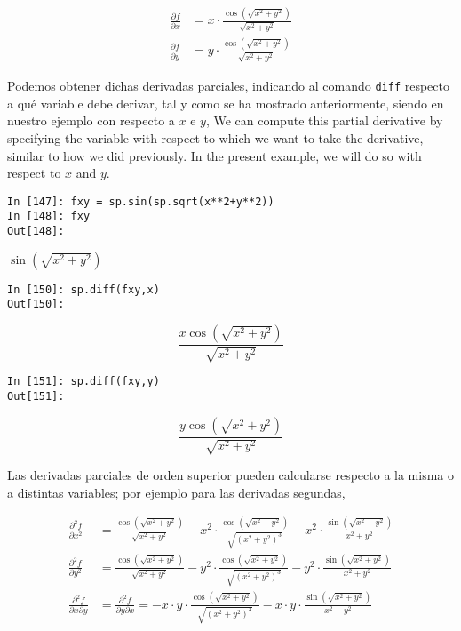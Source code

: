 \begin{align*}
\frac{\partial f}{\partial x} &= x\cdot\frac{\cos(\sqrt{x^2+y^2})}{\sqrt{x^2+y^2}} \\
\frac{\partial f}{\partial y} &= y\cdot\frac{\cos(\sqrt{x^2+y^2})}{\sqrt{x^2+y^2}}
\end{align*}
\begin{paracol}{2}
Podemos obtener dichas derivadas parciales, indicando al comando \texttt{diff} respecto a qué variable debe derivar, tal y como se ha mostrado anteriormente, siendo en nuestro ejemplo con respecto a $x$ e $y$,
\switchcolumn
We can compute this partial derivative by specifying the variable with respect to which we want to take the derivative, similar to how we did previously. In the present example, we will do so with respect to \(x\) and \(y\).  
\end{paracol}
\begin{center}
	\begin{minipage}{.5\textwidth}
		\begin{verbatim}
In [147]: fxy = sp.sin(sp.sqrt(x**2+y**2))
In [148]: fxy
Out[148]: 	
		\end{verbatim}
		$\sin(\sqrt{x^2+ y^2})$
		\begin{verbatim}
In [150]: sp.diff(fxy,x)
Out[150]: 
		\end{verbatim}
		\begin{equation*} \frac{x\cos(\sqrt{x^2+y^2})}{\sqrt{x^2+y^2}}\end{equation*}
		\begin{verbatim}
In [151]: sp.diff(fxy,y)
Out[151]:   
		\end{verbatim}
		\begin{equation*} \frac{y\cos(\sqrt{x^2+y^2})}{\sqrt{x^2+y^2}}\end{equation*}
	\end{minipage}
\end{center}

\begin{paracol}{2}
Las derivadas parciales de orden superior pueden calcularse respecto a la misma o a distintas variables; por ejemplo para las derivadas segundas,
\end{paracol}
\begin{align*}
\frac{\partial^2f}{\partial x^2} &= \frac{\cos(\sqrt{x^2+y^2})}{\sqrt{x^2+y^2}} - 
x^2 \cdot \frac{\cos(\sqrt{x^2+y^2})}{\sqrt{(x^2+y^2)^3}} -
x^2 \cdot \frac{\sin(\sqrt{x^2+y^2})}{x^2+y^2} \\
\frac{\partial^2f}{\partial y^2} &= \frac{\cos(\sqrt{x^2+y^2})}{\sqrt{x^2+y^2}} - 
y^2 \cdot \frac{\cos(\sqrt{x^2+y^2})}{\sqrt{(x^2+y^2)^3}} -
y^2 \cdot \frac{\sin(\sqrt{x^2+y^2})}{x^2+y^2} \\
\frac{\partial^2f}{\partial x\partial y} &= \frac{\partial^2f}{\partial y\partial x} =-x\cdot y\cdot\frac{\cos(\sqrt{x^2+y^2})}{\sqrt{(x^2+y^2)^3}} - 
x\cdot y \cdot\frac{\sin(\sqrt{x^2+y^2})}{x^2+y^2} 
\end{align*}

